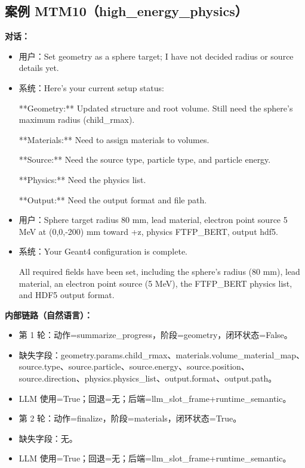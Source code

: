 \documentclass[11pt]{ctexart}
\begin{document}
\subsection{案例 MTM10（high\_energy\_physics）}
\textbf{对话：}
\begin{itemize}
\item 用户：Set geometry as a sphere target; I have not decided radius or source details yet.
\item 系统：Here's your current setup status:

**Geometry:** Updated structure and root volume. Still need the sphere's maximum radius (child\_rmax).

**Materials:** Need to assign materials to volumes.

**Source:** Need the source type, particle type, and particle energy.

**Physics:** Need the physics list.

**Output:** Need the output format and file path.
\item 用户：Sphere target radius 80 mm, lead material, electron point source 5 MeV at (0,0,-200) mm toward +z, physics FTFP\_BERT, output hdf5.
\item 系统：Your Geant4 configuration is complete.

All required fields have been set, including the sphere's radius (80 mm), lead material, an electron point source (5 MeV), the FTFP\_BERT physics list, and HDF5 output format.
\end{itemize}
\textbf{内部链路（自然语言）：}
\begin{itemize}
\item 第 1 轮：动作=summarize\_progress，阶段=geometry，闭环状态=False。
\item 缺失字段：geometry.params.child\_rmax、materials.volume\_material\_map、source.type、source.particle、source.energy、source.position、source.direction、physics.physics\_list、output.format、output.path。
\item LLM 使用=True；回退=无；后端=llm\_slot\_frame+runtime\_semantic。
\item 第 2 轮：动作=finalize，阶段=materials，闭环状态=True。
\item 缺失字段：无。
\item LLM 使用=True；回退=无；后端=llm\_slot\_frame+runtime\_semantic。
\end{itemize}
\end{document}
